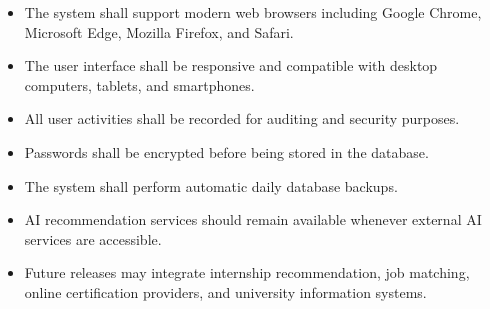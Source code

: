 \begin{itemize}

\item The system shall support modern web browsers including Google Chrome, Microsoft Edge, Mozilla Firefox, and Safari.

\item The user interface shall be responsive and compatible with desktop computers, tablets, and smartphones.

\item All user activities shall be recorded for auditing and security purposes.

\item Passwords shall be encrypted before being stored in the database.

\item The system shall perform automatic daily database backups.

\item AI recommendation services should remain available whenever external AI services are accessible.

\item Future releases may integrate internship recommendation, job matching, online certification providers, and university information systems.

\end{itemize}

